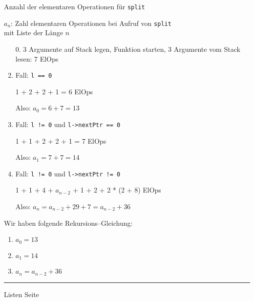 
\begin{slide}{}
\normalsize

\begin{center}
Anzahl der elementaren Operationen f\"ur \texttt{split}
\end{center}
\vspace*{0.5cm}

\footnotesize
$a_n$: Zahl elementaren Operationen bei Aufruf von \texttt{split} \\[0.3cm]
\hspace*{0.8cm} mit Liste der L\"ange $n$

\begin{enumerate}
\item[0.] 3 Argumente auf Stack legen, Funktion starten, 3 Argumente vom Stack 
          lesen: 7 ElOps
\item Fall: \texttt{l == 0}
      
      1 + 2 + 2 + 1 = 6 ElOps

      Also: $a_0 = 6 + 7 = 13$
\item Fall: \texttt{l != 0} und \texttt{l->nextPtr == 0}

      1 + 1 + 2 + 2 + 1 = 7 ElOps

      Also: $a_1 = 7 + 7 = 14$
\item Fall: \texttt{l != 0} und \texttt{l->nextPtr != 0}

      1 + 1 + 4 + $a_{n-2}$ + 1 + 2 + 2 * (2 + 8) ElOps

      Also: $a_{n} = a_{n-2} + 29 + 7 = a_{n-2} + 36$
\end{enumerate}
Wir haben folgende Rekursions--Gleichung:
\begin{enumerate}
\item $a_0 = 13$
\item $a_1 = 14$
\item $a_n = a_{n-2} + 36$
\end{enumerate}


\vspace*{\fill}
\tiny \addtocounter{mypage}{1}
\rule{17cm}{1mm}
Listen  \hspace*{\fill} Seite 
\end{slide}


